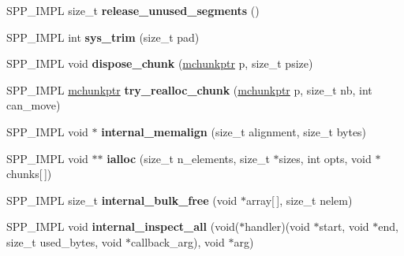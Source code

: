 \begin{DoxyCompactItemize}
\item 
S\+P\+P\+\_\+\+I\+M\+PL size\+\_\+t {\bfseries release\+\_\+unused\+\_\+segments} ()\hypertarget{classspp_1_1malloc__state_ae9d5b38d1f822866f53d2aa8bb1cfdc9}{}\label{classspp_1_1malloc__state_ae9d5b38d1f822866f53d2aa8bb1cfdc9}

\item 
S\+P\+P\+\_\+\+I\+M\+PL int {\bfseries sys\+\_\+trim} (size\+\_\+t pad)\hypertarget{classspp_1_1malloc__state_a8650f05c89acbb6200d66893513bc31d}{}\label{classspp_1_1malloc__state_a8650f05c89acbb6200d66893513bc31d}

\item 
S\+P\+P\+\_\+\+I\+M\+PL void {\bfseries dispose\+\_\+chunk} (\hyperlink{structspp_1_1malloc__chunk}{mchunkptr} p, size\+\_\+t psize)\hypertarget{classspp_1_1malloc__state_a8adcdd3083b435bd79363f2548234087}{}\label{classspp_1_1malloc__state_a8adcdd3083b435bd79363f2548234087}

\item 
S\+P\+P\+\_\+\+I\+M\+PL \hyperlink{structspp_1_1malloc__chunk}{mchunkptr} {\bfseries try\+\_\+realloc\+\_\+chunk} (\hyperlink{structspp_1_1malloc__chunk}{mchunkptr} p, size\+\_\+t nb, int can\+\_\+move)\hypertarget{classspp_1_1malloc__state_a5a067b16f5d28b425138921634b389d4}{}\label{classspp_1_1malloc__state_a5a067b16f5d28b425138921634b389d4}

\item 
S\+P\+P\+\_\+\+I\+M\+PL void $\ast$ {\bfseries internal\+\_\+memalign} (size\+\_\+t alignment, size\+\_\+t bytes)\hypertarget{classspp_1_1malloc__state_a2bc26a09f2678723c01ea4be6f93c2f6}{}\label{classspp_1_1malloc__state_a2bc26a09f2678723c01ea4be6f93c2f6}

\item 
S\+P\+P\+\_\+\+I\+M\+PL void $\ast$$\ast$ {\bfseries ialloc} (size\+\_\+t n\+\_\+elements, size\+\_\+t $\ast$sizes, int opts, void $\ast$chunks\mbox{[}$\,$\mbox{]})\hypertarget{classspp_1_1malloc__state_a8a02edd5571fbdd2af38963209094ac9}{}\label{classspp_1_1malloc__state_a8a02edd5571fbdd2af38963209094ac9}

\item 
S\+P\+P\+\_\+\+I\+M\+PL size\+\_\+t {\bfseries internal\+\_\+bulk\+\_\+free} (void $\ast$array\mbox{[}$\,$\mbox{]}, size\+\_\+t nelem)\hypertarget{classspp_1_1malloc__state_ac24182cd5c6c13ca387edbc8a1e4c179}{}\label{classspp_1_1malloc__state_ac24182cd5c6c13ca387edbc8a1e4c179}

\item 
S\+P\+P\+\_\+\+I\+M\+PL void {\bfseries internal\+\_\+inspect\+\_\+all} (void($\ast$handler)(void $\ast$start, void $\ast$end, size\+\_\+t used\+\_\+bytes, void $\ast$callback\+\_\+arg), void $\ast$arg)\hypertarget{classspp_1_1malloc__state_ace0c165766c8dd4ccd49483bb5abe0b0}{}\label{classspp_1_1malloc__state_ace0c165766c8dd4ccd49483bb5abe0b0}


\end{DoxyCompactItemize}
